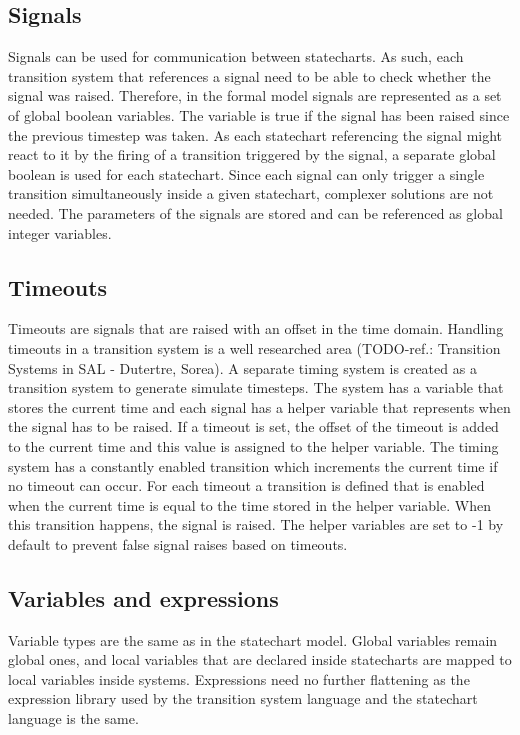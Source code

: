 \documentclass{book}
\begin{document}
{  \subsection{Signals}
Signals can be used for communication between statecharts. As such, each transition system that references a signal need to be able to check whether the signal was raised. Therefore, in the formal model signals are represented as a set of global boolean variables. The variable is true if the signal has been raised since the previous timestep was taken. As each statechart referencing the signal might react to it by the firing of a transition triggered by the signal, a separate global boolean is used for each statechart. Since each signal can only trigger a single transition simultaneously inside a given statechart, complexer solutions are not needed. The parameters of the signals are stored and can be referenced as global integer variables.
  \subsection{Timeouts}
Timeouts are signals that are raised with an offset in the time domain. Handling timeouts in a transition system is a well researched area (TODO-ref.: Transition Systems in SAL - Dutertre, Sorea). A separate timing system is created as a transition system to generate simulate timesteps. The system has a variable that stores the current time and each signal has a helper variable that represents when the signal has to be raised. If a timeout is set, the offset of the timeout is added to the current time and this value is assigned to the helper variable. The timing system has a constantly enabled transition which increments the current time if no timeout can occur. For each timeout a transition is defined that is enabled when the current time is equal to the time stored in the helper variable. When this transition happens, the signal is raised. The helper variables are set to -1 by default to prevent false signal raises based on timeouts.
  \subsection{Variables and expressions}
Variable types are the same as in the statechart model. Global variables remain global ones, and local variables that are declared inside statecharts are mapped to local variables inside systems. Expressions need no further flattening as the expression library used by the transition system language and the statechart language is the same.
}
\end{document}
